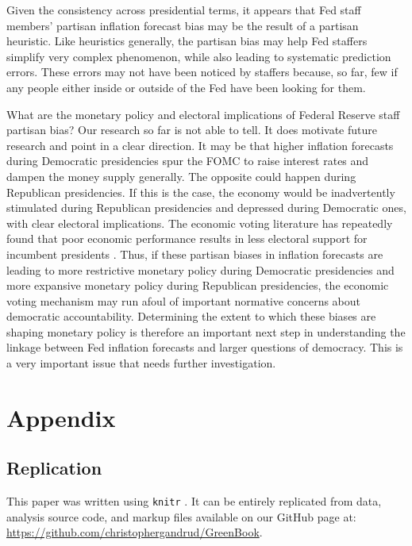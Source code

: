 \documentclass[a4paper]{article}\usepackage{graphicx, color}
\begin{document}
Given the consistency across presidential terms, it appears that Fed staff members' partisan inflation forecast bias may be the result of a partisan heuristic. Like heuristics generally, the partisan bias may help Fed staffers simplify very complex phenomenon, while also leading to systematic prediction errors. These errors may not have been noticed by staffers because, so far, few if any people either inside or outside of the Fed have been looking for them. 

What are the monetary policy and electoral implications of Federal Reserve staff partisan bias? Our research so far is not able to tell. It does motivate future research and point in a clear direction. It may be that higher inflation forecasts during Democratic presidencies spur the FOMC to raise interest rates and dampen the money supply generally. The opposite could happen during Republican presidencies. If this is the case, the economy would be inadvertently stimulated during Republican presidencies and depressed during Democratic ones, with clear electoral implications. The economic voting literature has repeatedly found that poor economic performance results in less electoral support for incumbent presidents \citep[e.g.]{Bloom1975}. Thus, if these partisan biases in inflation forecasts are leading to more restrictive monetary policy during Democratic presidencies and more expansive monetary policy during Republican presidencies, the economic voting mechanism may run afoul of important normative concerns about democratic accountability. Determining the extent to which these biases are shaping monetary policy is therefore an important next step in understanding the linkage between Fed inflation forecasts and larger questions of democracy. This is a very important issue that needs further investigation.

\clearpage
\section*{Appendix}

\subsection*{Replication}

This paper was written using {\tt{knitr}} \citep{knitr2012}. It can be entirely replicated from data, analysis source code, and markup files available on our GitHub page at: {\url{https://github.com/christophergandrud/GreenBook}}. 
\end{document}
